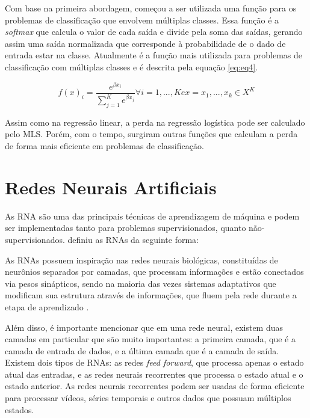 Com base na primeira abordagem, começou a ser utilizada uma função para os problemas de classificação que envolvem múltiplas classes. Essa função é a \textit{softmax} que calcula o valor de cada saída e divide pela soma das saídas, gerando assim uma saída normalizada que corresponde à probabilidade de o dado de entrada estar na classe. Atualmente é a função mais utilizada para problemas de classificação com múltiplas classes e é descrita pela equação \ref{eq:eq4}.

\begin{equation}
\label{eq:eq4}
	f(x)_i = \dfrac{e^{\beta x_i}}{\sum_{j = 1}^{K}e^{\beta x_j}} \forall i = 1,...,K e x = {x_1, ... ,x_k} \in X^K
\end{equation}

Assim como na regressão linear, a perda na regressão logística pode ser calculado pelo \ac{MLS}. Porém, com o tempo, surgiram outras funções que calculam a perda de forma mais eficiente em problemas de classificação.

\section{Redes Neurais Artificiais}
\label{secao:2:2}

As \ac{RNA} são uma das principais técnicas de aprendizagem de máquina e podem ser implementadas tanto para problemas supervisionados, quanto não-supervisionados.  definiu as \ac{RNA}s da seguinte forma:

\begin{citacao}
	As \ac{RNA}s possuem inspiração nas redes neurais biológicas, constituídas de neurônios separados por camadas, que processam informações e estão conectados via pesos sinápticos, sendo na maioria das vezes sistemas adaptativos que modificam sua estrutura através de informações, que fluem pela rede durante a etapa de aprendizado \cite{jost-2015}.
\end{citacao}

Além disso, é importante mencionar que em uma rede neural, existem duas camadas em particular que são muito importantes: a primeira camada, que é a camada de entrada de dados, e a última camada que é a camada de saída. Existem dois tipos de \ac{RNA}s: as redes \textit{feed forward}, que processa apenas o estado atual das entradas, e as redes neurais recorrentes que processa o estado atual e o estado anterior. As redes neurais recorrentes podem ser usadas de forma eficiente para processar vídeos, séries temporais e outros dados que possuam múltiplos estados.

